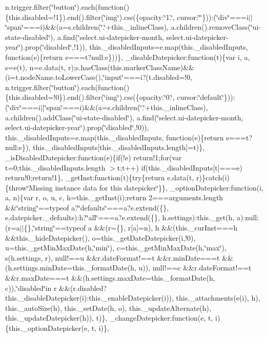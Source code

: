 \begin{DoxyCompactItemize}
n.\+trigger.\+filter(\char`\"{}button\char`\"{}).\+each(function()\{this.\+disabled=!1\}).\+end().\+filter(\char`\"{}img\char`\"{}).\+css(\{opacity\+:\char`\"{}1.\char`\"{}, cursor\+:\char`\"{}\char`\"{}\}))\+:(\char`\"{}div\char`\"{}===i$\vert$$\vert$\char`\"{}span\char`\"{}===i)\&\&(a=s.\+children(\char`\"{}.\char`\"{}+this.\+\_\+inline\+Class), a.\+children().\+remove\+Class(\char`\"{}ui-\/state-\/disabled\char`\"{}), a.\+find(\char`\"{}select.\+ui-\/datepicker-\/month, select.\+ui-\/datepicker-\/year\char`\"{}).\+prop(\char`\"{}disabled\char`\"{},!1)), this.\+\_\+disabled\+Inputs=e.\+map(this.\+\_\+disabled\+Inputs, function(e)\{return e===t?null\+:e\}))\}, \+\_\+disable\+Datepicker\+:function(t)\{var i, a, s=e(t), n=e.\+data(t, r);s.\+has\+Class(this.\+marker\+Class\+Name)\&\&(i=t.\+node\+Name.\+to\+Lower\+Case(),\char`\"{}input\char`\"{}===i?(t.\+disabled=!0, n.\+trigger.\+filter(\char`\"{}button\char`\"{}).\+each(function()\{this.\+disabled=!0\}).\+end().\+filter(\char`\"{}img\char`\"{}).\+css(\{opacity\+:\char`\"{}0.\char`\"{}, cursor\+:\char`\"{}default\char`\"{}\}))\+:(\char`\"{}div\char`\"{}===i$\vert$$\vert$\char`\"{}span\char`\"{}===i)\&\&(a=s.\+children(\char`\"{}.\char`\"{}+this.\+\_\+inline\+Class), a.\+children().\+add\+Class(\char`\"{}ui-\/state-\/disabled\char`\"{}), a.\+find(\char`\"{}select.\+ui-\/datepicker-\/month, select.\+ui-\/datepicker-\/year\char`\"{}).\+prop(\char`\"{}disabled\char`\"{},!0)), this.\+\_\+disabled\+Inputs=e.\+map(this.\+\_\+disabled\+Inputs, function(e)\{return e===t?null\+:e\}), this.\+\_\+disabled\+Inputs\mbox{[}this.\+\_\+disabled\+Inputs.\+length\mbox{]}=t)\}, \+\_\+is\+Disabled\+Datepicker\+:function(e)\{if(!e) return!1;for(var t=0;this.\+\_\+disabled\+Inputs.\+length $>$t;t++) if(this.\+\_\+disabled\+Inputs\mbox{[}t\mbox{]}===e) return!0;return!1\}, \+\_\+get\+Inst\+:function(t)\{try\{return e.\+data(t, r)\}catch(i)\{throw\char`\"{}\+Missing instance data for this datepicker\char`\"{}\}\}, \+\_\+option\+Datepicker\+:function(i, a, n)\{var r, o, u, c, h=this.\+\_\+get\+Inst(i);return 2===arguments.\+length \&\&\char`\"{}string\char`\"{}==typeof a?\char`\"{}defaults\char`\"{}===a?e.\+extend(\{\}, e.\+datepicker.\+\_\+defaults)\+:h?\char`\"{}all\char`\"{}===a?e.\+extend(\{\}, h.\+settings)\+:this.\+\_\+get(h, a)\+:null\+:(r=a$\vert$$\vert$\{\},\char`\"{}string\char`\"{}==typeof a \&\&(r=\{\}, r\mbox{[}a\mbox{]}=n), h \&\&(this.\+\_\+cur\+Inst===h \&\&this.\+\_\+hide\+Datepicker(), o=this.\+\_\+get\+Date\+Datepicker(i,!0), u=this.\+\_\+get\+Min\+Max\+Date(h,\char`\"{}min\char`\"{}), c=this.\+\_\+get\+Min\+Max\+Date(h,\char`\"{}max\char`\"{}), s(h.\+settings, r), null!==u \&\&r.\+date\+Format!==t \&\&r.\+min\+Date===t \&\&(h.\+settings.\+min\+Date=this.\+\_\+format\+Date(h, u)), null!==c \&\&r.\+date\+Format!==t \&\&r.\+max\+Date===t \&\&(h.\+settings.\+max\+Date=this.\+\_\+format\+Date(h, c)),\char`\"{}disabled\char`\"{}in r \&\&(r.\+disabled?this.\+\_\+disable\+Datepicker(i)\+:this.\+\_\+enable\+Datepicker(i)), this.\+\_\+attachments(e(i), h), this.\+\_\+auto\+Size(h), this.\+\_\+set\+Date(h, o), this.\+\_\+update\+Alternate(h), this.\+\_\+update\+Datepicker(h)), t)\}, \+\_\+change\+Datepicker\+:function(e, t, i)\{this.\+\_\+option\+Datepicker(e, t, i)\}, 
\end{DoxyCompactItemize}
